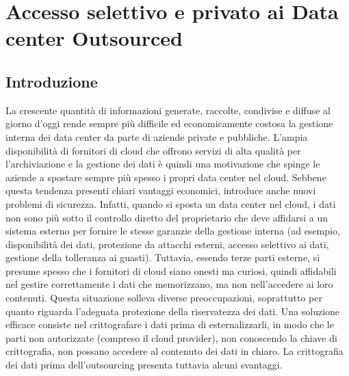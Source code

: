 \chapter{Accesso selettivo e privato ai Data center Outsourced}

\section{Introduzione}
La crescente quantità di informazioni generate, raccolte, condivise e diffuse al giorno d'oggi rende sempre più difficile ed economicamente costosa la gestione interna dei data center da parte di aziende private e pubbliche. L'ampia disponibilità di fornitori di cloud che offrono servizi di alta qualità per l'archiviazione e la gestione dei dati è quindi una motivazione che spinge le aziende a spostare sempre più spesso i propri data center nel cloud. Sebbene questa tendenza presenti chiari vantaggi economici, introduce anche nuovi problemi di sicurezza. Infatti, quando si sposta un data center nel cloud, i dati non sono più sotto il controllo diretto del proprietario che deve affidarsi a un sistema esterno per fornire le stesse garanzie della gestione interna (ad esempio, disponibilità dei dati, protezione da attacchi esterni, accesso selettivo ai dati, gestione della tolleranza ai guasti). Tuttavia, essendo terze parti esterne, si presume spesso che i fornitori di cloud siano onesti ma curiosi, quindi affidabili nel gestire correttamente i dati che memorizzano, ma non nell'accedere ai loro contenuti. Questa situazione solleva diverse preoccupazioni, soprattutto per quanto riguarda l'adeguata protezione della riservatezza dei dati. Una soluzione efficace consiste nel crittografare i dati prima di esternalizzarli, in modo che le parti non autorizzate (compreso il cloud provider), non conoscendo la chiave di crittografia, non possano accedere al contenuto dei dati in chiaro. La crittografia dei dati prima dell'outsourcing presenta tuttavia alcuni svantaggi.
\\
\newline
